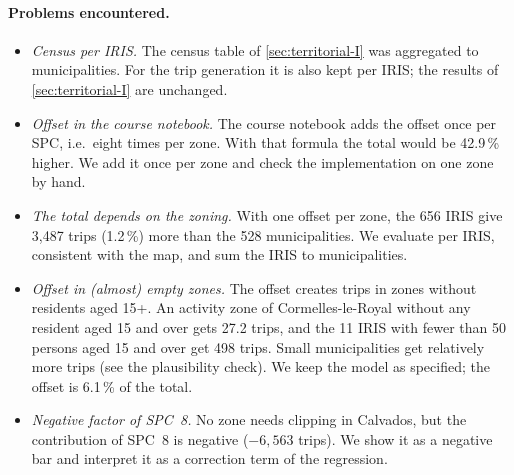 \paragraph{Problems encountered.}
\begin{itemize}
  \item \emph{Census per IRIS.} The census table of \cref{sec:territorial-I} was aggregated to municipalities. For the
  trip generation it is also kept per IRIS; the results of \cref{sec:territorial-I} are unchanged.
  \item \emph{Offset in the course notebook.} The course notebook adds the offset once per SPC, i.e.\ eight times per
  zone. With that formula the total would be 42.9\,\% higher. We add it once per zone and check the implementation on
  one zone by hand.
  \item \emph{The total depends on the zoning.} With one offset per zone, the 656 IRIS give 3{,}487 trips (1.2\,\%) more
  than the 528 municipalities. We evaluate per IRIS, consistent with the map, and sum the IRIS to municipalities.
  \item \emph{Offset in (almost) empty zones.} The offset creates trips in zones without residents aged 15+. An activity zone of
  Cormelles-le-Royal without any resident aged 15 and over gets 27.2 trips, and the 11 IRIS with fewer than 50 persons
  aged 15 and over get 498 trips. Small municipalities get relatively more trips (see the plausibility check). We keep
  the model as specified; the offset is 6.1\,\% of the total.
  \item \emph{Negative factor of SPC~8.} No zone needs clipping in Calvados, but the contribution of SPC~8 is negative
  ($-6{,}563$ trips). We show it as a negative bar and interpret it as a correction term of the regression.
\end{itemize}
